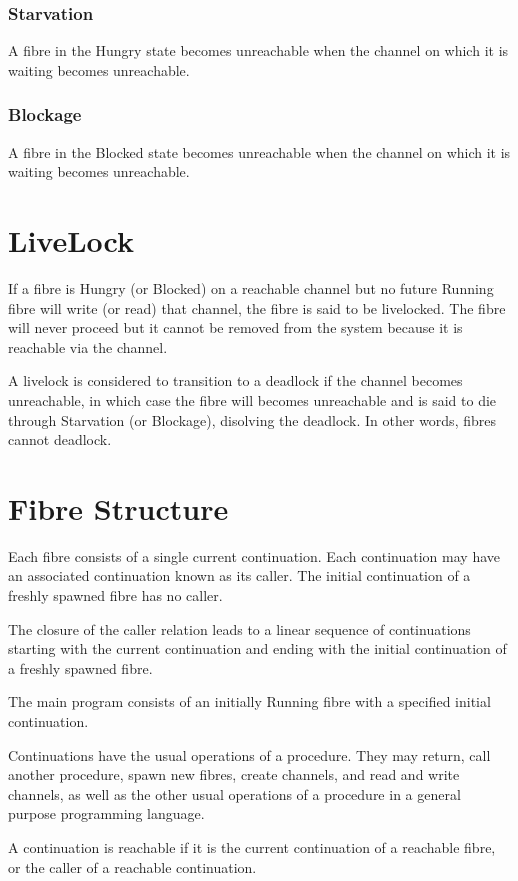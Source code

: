 \documentclass{article}
\begin{document}
\subsubsection{Starvation}
A fibre in the Hungry state becomes unreachable when the
channel on which it is waiting becomes unreachable.

\subsubsection{Blockage}
A fibre in the Blocked state becomes unreachable 
when the channel on which it is waiting becomes unreachable.

\section{LiveLock}
If a fibre is Hungry (or Blocked) on a reachable channel
but no future Running fibre will write (or read) that
channel, the fibre is said to be livelocked. The fibre
will never proceed but it cannot be removed from
the system because it is reachable via the channel.

A livelock is considered to transition to a deadlock
if the channel becomes unreachable, in which case
the fibre will becomes unreachable and is said to
die through Starvation (or Blockage),
disolving the deadlock. In other words, fibres cannot deadlock.


\section{Fibre Structure}
Each fibre consists of a single current continuation.
Each continuation may have an associated continuation
known as its caller. The initial continuation of a freshly
spawned fibre has no caller.

The closure of the caller relation leads to a linear
sequence of continuations starting with the current
continuation and ending with the initial continuation
of a freshly spawned fibre.

The main program consists of an initially Running
fibre with a specified initial continuation.

Continuations have the usual operations of a procedure.
They may return, call another procedure, spawn new
fibres, create channels, and read and write channels,
as well as the other usual operations of a procedure
in a general purpose programming language.

A continuation is reachable if it is the current
continuation of a reachable fibre, or the caller
of a reachable continuation.
\end{document}
